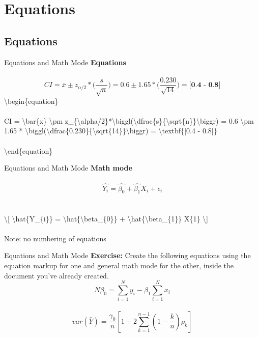 \documentclass[xcolor=dvipsnames]{beamer}
\begin{document}
\section{Equations}
\subsection{Equations}

\begin{frame}{\LARGE{Equations and Math Mode}}
\textbf{\Large{Equations}}\\~\\

\begin{equation}
CI = \bar{x} \pm z_{\alpha/2}*\biggl(\dfrac{s}{\sqrt{n}}\biggr) = 0.6 \pm 1.65 * \biggl(\dfrac{0.230}{\sqrt{14}}\biggr) = \textbf{[0.4 - 0.8]}
\end{equation}
\textbackslash begin\{equation\}\\~\\
CI = \textbackslash bar\{x\} \textbackslash pm z\_\{\textbackslash alpha/2\}*\textbackslash biggl(\textbackslash dfrac\{s\}\{\textbackslash sqrt\{n\}\}\textbackslash biggr) = 0.6 \textbackslash pm 1.65 * \textbackslash biggl(\textbackslash dfrac\{0.230\}\{\textbackslash sqrt\{14\}\}\textbackslash biggr) = \textbackslash textbf\{[0.4 - 0.8]\}\\~\\
\textbackslash end\{equation\}
\end{frame}

\begin{frame}{\LARGE{Equations and Math Mode}}
\textbf{\Large{Math mode}}\\~\\
\[ \hat{Y_{i}} = \hat{\beta_{0}} + \hat{\beta_{1}}X_{i} + \epsilon_{i} \]~\\~\\

\textbackslash[ \textbackslash hat\{Y\_\{i\}\} = \textbackslash hat\{\textbackslash beta\_\{0\}\} + \textbackslash hat\{\textbackslash beta\_\{1\}\} X\-\{1\} \textbackslash] \\~\\

\Large{Note: no numbering of equations}
\end{frame}

\begin{frame}{\LARGE{Equations and Math Mode}}
\Large{\textbf{Exercise:} Create the following equations using the equation markup for one and general math mode for the other, inside the document you've already created.}
\begin{equation}
N\beta_{0} = \sum\limits_{i=1}^{N}y_{i} -\beta_{1}\sum\limits_{i=1}^{N}x_{i}
\end{equation}~\\
$$var(\bar{Y}) = \dfrac{\gamma_{0}}{n}[1+2 \sum\limits_{k=1}^{n-1} (1-\dfrac{k}{n}) \rho_{k}]$$
\end{frame}
\end{document}
